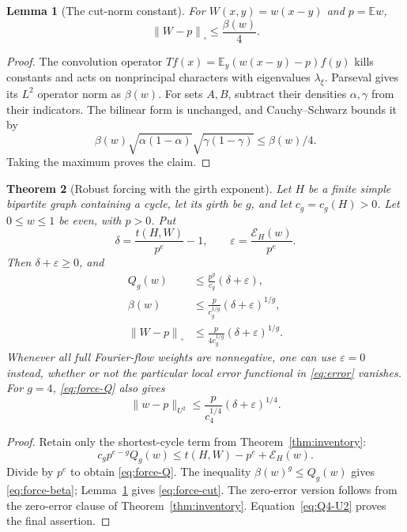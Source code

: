 \documentclass[11pt]{article}
\numberwithin{equation}{section}
\newtheorem{theorem}{Theorem}[section]
\newtheorem{lemma}[theorem]{Lemma}
\theoremstyle{definition}
\theoremstyle{remark}
\newcommand{\E}{\mathbb E}
\newcommand{\Cut}[1]{\left\|#1\right\|_{\square}}
\newcommand{\Err}{\mathcal E}
\newcommand{\eps}{\varepsilon}
\begin{document}
\begin{lemma}[The cut-norm constant]
\label{lem:cut}
For $W(x,y)=w(x-y)$ and $p=\E w$,
\begin{equation}
 \Cut{W-p}\leq\frac{\beta(w)}4.
 \label{eq:cut-beta}
\end{equation}
\end{lemma}
\begin{proof}
The convolution operator
$Tf(x)=\E_y(w(x-y)-p)f(y)$ kills constants and acts on nonprincipal
characters with eigenvalues $\lambda_\xi$. Parseval gives its $L^2$
operator norm as $\beta(w)$. For sets $A,B$, subtract their densities
$\alpha,\gamma$ from their indicators. The bilinear form is unchanged,
and Cauchy--Schwarz bounds it by
\[
 \beta(w)\sqrt{\alpha(1-\alpha)}
              \sqrt{\gamma(1-\gamma)}\leq\beta(w)/4.
\]
Taking the maximum proves the claim.
\end{proof}

\begin{theorem}[Robust forcing with the girth exponent]
\label{thm:forcing}
Let $H$ be a finite simple bipartite graph containing a cycle, let its
girth be $g$, and let $c_g=c_g(H)>0$. Let $0\leq w\leq1$ be even,
with $p>0$. Put
\begin{equation}
 \delta=\frac{t(H,W)}{p^e}-1,
 \qquad \eps=\frac{\Err_H(w)}{p^e}.
 \label{eq:global-delta}
\end{equation}
Then $\delta+\eps\geq0$, and
\begin{align}
 Q_g(w)&\leq\frac{p^g}{c_g}(\delta+\eps),\label{eq:force-Q}\\
 \beta(w)&\leq\frac{p}{c_g^{1/g}}(\delta+\eps)^{1/g},\label{eq:force-beta}\\
 \Cut{W-p}&\leq\frac{p}{4c_g^{1/g}}
                    (\delta+\eps)^{1/g}.
 \label{eq:force-cut}
\end{align}
Whenever all full Fourier-flow weights are nonnegative, one can use
$\eps=0$ instead, whether or not the particular local error functional
in \eqref{eq:error} vanishes. For $g=4$, \eqref{eq:force-Q} also gives
\begin{equation}
 \|w-p\|_{U^2}\leq\frac{p}{c_4^{1/4}}(\delta+\eps)^{1/4}.
 \label{eq:force-u2}
\end{equation}
\end{theorem}
\begin{proof}
Retain only the shortest-cycle term from Theorem~\ref{thm:inventory}:
\[
 c_gp^{e-g}Q_g(w)\leq t(H,W)-p^e+\Err_H(w).
\]
Divide by $p^e$ to obtain \eqref{eq:force-Q}. The inequality
$\beta(w)^g\leq Q_g(w)$ gives \eqref{eq:force-beta};
Lemma~\ref{lem:cut} gives \eqref{eq:force-cut}. The zero-error version
follows from the zero-error clause of Theorem~\ref{thm:inventory}.
Equation~\eqref{eq:Q4-U2} proves the final assertion.
\end{proof}
\end{document}

